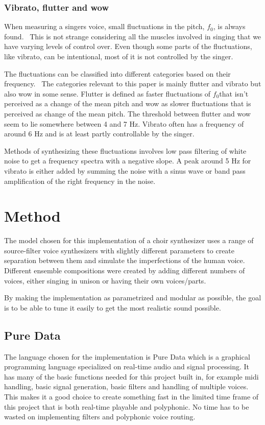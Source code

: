 \documentclass{article}
\newcommand{\fo}{$f_0$}
\begin{document}
\subsubsection{Vibrato, flutter and wow}\label{subsec:vibflutwow}
When measuring a singers voice, small fluctuations in the pitch, \fo, is always found.~\cite{ternstrom:89} This is not strange considering all the muscles involved in singing that we have varying levels of control over. Even though some parts of the fluctuations, like vibrato, can be intentional, most of it is not controlled by the singer.

The fluctuations can be classified into different categories based on their frequency.~\cite{ternstrom:89} The categories relevant to this paper is mainly flutter and vibrato but also wow in some sense. Flutter is defined as faster fluctuations of \fo  that isn't perceived as a change of the mean pitch and wow as slower fluctuations that is perceived as change of the mean pitch. The threshold between flutter and wow seem to lie somewhere between 4 and 7 Hz. Vibrato often has a frequency of around 6 Hz and is at least partly controllable by the singer.

Methods of synthesizing these fluctuations involves low pass filtering of white noise to get a frequency spectra with a negative slope. A peak around 5 Hz for vibrato is either added by summing the noise with a sinus wave or band pass amplification of the right frequency in the noise.~\cite{ternstrom:88, ternstrom:99}

\section{Method}\label{sec:method}
The model chosen for this implementation of a choir synthesizer uses a range of source-filter voice synthesizers with slightly different parameters to create separation between them and simulate the imperfections of the human voice. Different ensemble compositions were created by adding different numbers of voices, either singing in unison or having their own voices/parts.

By making the implementation as parametrized and modular as possible, the goal is to be able to tune it easily to get the most realistic sound possible.

\subsection{Pure Data}
The language chosen for the implementation is Pure Data which is a graphical programming language specialized on real-time audio and signal processing. It has many of the basic functions needed for this project built in, for example midi handling, basic signal generation, basic filters and handling of multiple voices. This makes it a good choice to create something fast in the limited time frame of this project that is both real-time playable and polyphonic. No time has to be wasted on implementing filters and polyphonic voice routing.
\end{document}
